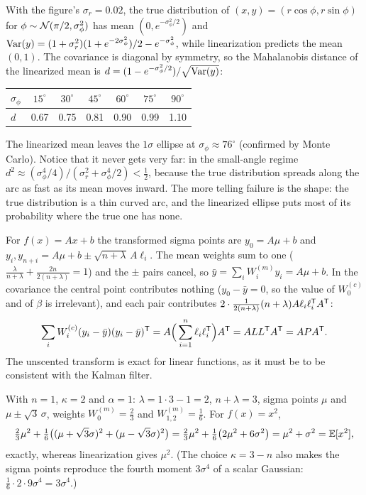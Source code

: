 \begin{solutions}
  \item With the figure's $\sigma_r = 0.02$, the true distribution of $(x, y) = (r\cos\phi, r\sin\phi)$ for $\phi \sim \mathcal{N}(\pi/2, \sigma_\phi^2)$ has mean $(0, e^{-\sigma_\phi^2/2})$ and
        $\operatorname{Var}(y) = (1 + \sigma_r^2)(1 + e^{-2\sigma_\phi^2})/2 - e^{-\sigma_\phi^2}$, while linearization predicts the mean $(0, 1)$. The covariance is diagonal by symmetry,
        so the Mahalanobis distance of the linearized mean is $d = (1 - e^{-\sigma_\phi^2/2})/\sqrt{\operatorname{Var}(y)}$:
        \begin{center}\small
        \begin{tabular}{@{}l c c c c c c@{}}
        \toprule
        $\sigma_\phi$ & $15^\circ$ & $30^\circ$ & $45^\circ$ & $60^\circ$ & $75^\circ$ & $90^\circ$ \\
        \midrule
        $d$ & 0.67 & 0.75 & 0.81 & 0.90 & 0.99 & 1.10 \\
        \bottomrule
        \end{tabular}
        \end{center}
        The linearized mean leaves the $1\sigma$ ellipse at $\sigma_\phi \approx 76^\circ$ (confirmed by Monte Carlo). Notice that it never gets very far: in the
        small-angle regime $d^2 \approx (\sigma_\phi^4/4)/(\sigma_r^2 + \sigma_\phi^4/2) < \tfrac12$, because the true distribution spreads along the arc as fast as its mean moves
        inward. The more telling failure is the shape: the true distribution is a thin curved arc, and the linearized ellipse puts most of its
        probability where the true one has none.

  \item For $f(x) = Ax + b$ the transformed sigma points are $y_0 = A\mu + b$ and $y_{i}, y_{n+i} = A\mu + b \pm\sqrt{n + \lambda}\,A\ell_i$. The mean weights sum to
        one ($\frac{\lambda}{n + \lambda} + \frac{2n}{2(n + \lambda)} = 1$) and the $\pm$ pairs cancel, so $\bar y = \sum_iW_i^{(m)}y_i = A\mu + b$. In the covariance the central point
        contributes nothing ($y_0 - \bar y = 0$, so the value of $W_0^{(c)}$ and of $\beta$ is irrelevant), and each pair contributes
        $2\cdot\frac{1}{2(n + \lambda)}(n + \lambda)A\ell_i\ell_i^{\mathsf{T}} A^{\mathsf{T}}$:
        \[
          \sum_iW_i^{(c)}(y_i - \bar y)(y_i - \bar y)^{\mathsf{T}} = A\Big(\sum_{i=1}^n\ell_i\ell_i^{\mathsf{T}}\Big)A^{\mathsf{T}} = ALL^{\mathsf{T}} A^{\mathsf{T}} = APA^{\mathsf{T}} .
        \]
        The unscented transform is exact for linear functions, as it must be to be consistent with the Kalman filter.

  \item With $n = 1$, $\kappa = 2$ and $\alpha = 1$: $\lambda = 1\cdot3 - 1 = 2$, $n + \lambda = 3$, sigma points $\mu$ and $\mu \pm \sqrt3\,\sigma$, weights $W_0^{(m)} = \tfrac23$ and
        $W_{1,2}^{(m)} = \tfrac16$. For $f(x) = x^2$,
        \[
          \tfrac23\mu^2 + \tfrac16\big((\mu + \sqrt3\sigma)^2 + (\mu - \sqrt3\sigma)^2\big) = \tfrac23\mu^2 + \tfrac16\big(2\mu^2 + 6\sigma^2\big) = \mu^2 + \sigma^2 = \mathbb{E}[x^2],
        \]
        exactly, whereas linearization gives $\mu^2$. (The choice $\kappa = 3 - n$ also makes the sigma points reproduce the fourth moment $3\sigma^4$ of a scalar
        Gaussian: $\tfrac16\cdot2\cdot9\sigma^4 = 3\sigma^4$.)


\end{solutions}
